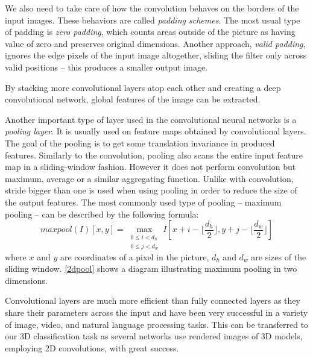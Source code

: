 

We also need to take care of how the convolution behaves on the borders of the input images. These behaviors are called \textit{padding schemes}. The most usual type of padding is \textit{zero padding}, which counts areas outside of the picture as having value of zero and preserves original dimensions. Another approach, \textit{valid padding}, ignores the edge pixels of the input image altogether, sliding the filter only across valid positions -- this produces a smaller output image. \par
By stacking more convolutional layers atop each other and creating a deep convolutional network,  global features of the image can be extracted. 
\par
Another important type of layer used in the convolutional neural networks is a \textit{pooling layer}. It is usually used on feature maps obtained by convolutional layers. The goal of the pooling is to get some translation invariance in produced features. Similarly to the convolution, pooling also scans the entire input feature map in a sliding-window fashion. However it does not perform convolution but maximum, average or a similar aggregating function. Unlike with convolution, stride bigger than one is used when using pooling in order to reduce the size of the output features.
The most commonly used type of pooling -- maximum pooling -- can be described by the following formula: 
$$maxpool(I)[x,y] =
\max_{\substack{0 \leq i < d_h\\
		0 \leq j < d_w}}
I[x + i - \lfloor \frac{d_h}{2} \rfloor, y + j - \lfloor \frac{d_w}{2}  \rfloor ] $$ where $x$ and $y$ are coordinates of a pixel in the picture, $d_h$ and $d_w$ are sizes of the sliding window. \autoref{2dpool} shows a diagram illustrating maximum pooling in two dimensions.\par
Convolutional layers are much more efficient than fully connected layers as they share their parameters across the input and have been very successful in a variety of image, video, and natural language processing tasks. This  can be transferred to our 3D classification task as several networks use rendered images of 3D models, employing 2D convolutions, with great success. 



